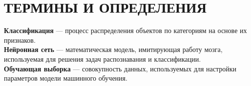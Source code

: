 \chapter*{ТЕРМИНЫ И ОПРЕДЕЛЕНИЯ}
\setlength{\parindent}{0pt} %
\textbf{Классификация} --- процесс распределения объектов по категориям на основе их признаков.\\[0.5em]
\textbf{Нейронная сеть} --- математическая модель, имитирующая работу мозга, используемая для решения задач распознавания и классификации.\\[0.5em]
\textbf{Обучающая выборка} --- совокупность данных, используемых для настройки параметров модели машинного обучения.
